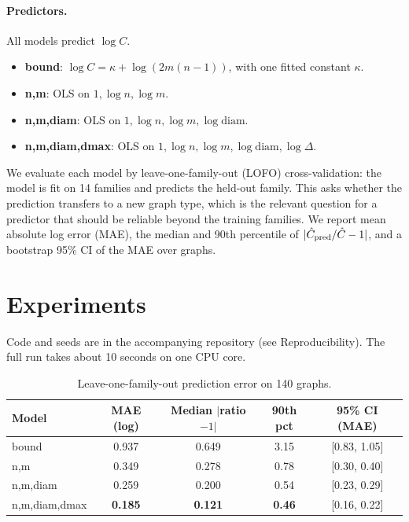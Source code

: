 \documentclass{article}
\begin{document}
\paragraph{Predictors.} All models predict $\log C$.
\begin{itemize}
\item \textbf{bound}: $\log C = \kappa + \log(2m(n-1))$, with one fitted constant $\kappa$.
\item \textbf{n,m}: OLS on $1,\log n,\log m$.
\item \textbf{n,m,diam}: OLS on $1,\log n,\log m,\log \mathrm{diam}$.
\item \textbf{n,m,diam,dmax}: OLS on $1,\log n,\log m,\log\mathrm{diam},\log\Delta$.
\end{itemize}
We evaluate each model by leave-one-family-out (LOFO) cross-validation: the model is fit on 14 families and predicts the held-out family. This asks whether the prediction transfers to a new graph type, which is the relevant question for a predictor that should be reliable beyond the training families. We report mean absolute log error (MAE), the median and 90th percentile of $|\hat C_{\rm pred}/\hat C-1|$, and a bootstrap 95\% CI of the MAE over graphs.

\section{Experiments}
Code and seeds are in the accompanying repository (see Reproducibility). The full run takes about 10 seconds on one CPU core.

\begin{table}[t]
\caption{Leave-one-family-out prediction error on 140 graphs.}
\label{tab:lofo}
\begin{center}
\begin{small}
\begin{tabular}{lcccc}
\toprule
Model & MAE (log) & Median $|$ratio$-1|$ & 90th pct & 95\% CI (MAE) \\
\midrule
bound & 0.937 & 0.649 & 3.15 & [0.83, 1.05] \\
n,m & 0.349 & 0.278 & 0.78 & [0.30, 0.40] \\
n,m,diam & 0.259 & 0.200 & 0.54 & [0.23, 0.29] \\
n,m,diam,dmax & \textbf{0.185} & \textbf{0.121} & \textbf{0.46} & [0.16, 0.22] \\
\bottomrule
\end{tabular}
\end{small}
\end{center}
\vskip -0.1in
\end{table}
\end{document}

